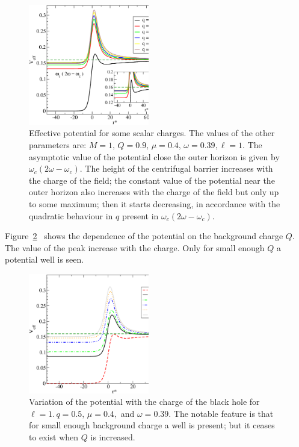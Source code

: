 \documentclass[aps, prd, twocolumn, amsmath, floats,floatfix, superscriptaddress,
nofootinbib, showpacs]{revtex4-1}
\begin{document}
\begin{figure}[!ht]
\includegraphics[width=0.47\textwidth]{m0.4_Q0.8_qs_w0.39.eps} 
\caption{Effective potential for some scalar charges. The values of the other
parameters are: $M=1,\,Q=0.9,\, \mu=0.4,\, \omega=0.39, \ell=1$. The  asymptotic value 
of the potential close the outer horizon is given by $\omega_c(2\omega-\omega_c)$. The
height of the centrifugal barrier increases with the charge of the field; the constant 
value of the potential near the outer horizon also increases with the charge of the field
but only up to some maximum; then it starts decreasing, in accordance with the quadratic
behaviour in $q$ present in $\omega_c(2\omega-\omega_c)$.}
\label{fig:pot_char}
\end{figure}

Figure~\ref{fig:pot_hbchar} \  shows the dependence of the potential on the background
charge $Q$. The value of the peak increase with the charge. Only for small enough $Q$ a
potential well is seen. 



\begin{figure}[!ht]
\includegraphics[width=0.47\textwidth]{m0.4_Qs_q0.5_w0.39.eps}
\caption{Variation of the potential with the charge of the black hole for
$\ell = 1$.$\,q=0.5,\, \mu=0.4,$ and $\omega=0.39$. The notable feature is that for small
enough background charge a well is present; but it ceases to exist when $Q$ is increased.}
\label{fig:pot_hbchar}
\end{figure}
\end{document}
